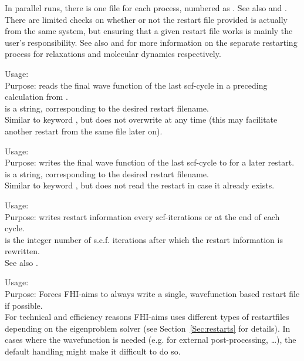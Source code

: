 In parallel runs, there is one file for each process, numbered 
as . See also  
and . There are limited checks on
whether or not the restart file provided is actually from the same
system, but ensuring that a given restart file works is mainly the
user's responsibility. See also 
and  for more information on the separate restarting process for
relaxations and molecular dynamics respectively.

{
  \noindent
  Usage:   \\[1.0ex]
  Purpose: reads the final wave function of the last scf-cycle in a
    preceding calculation from .\\[1.0ex]
   is a string, corresponding to the desired restart
  filename. \\
} 
Similar to keyword , but does not overwrite
 at any time (this may facilitate another restart from 
the same file later on). 

{
  \noindent
  Usage:   \\[1.0ex]
  Purpose: writes the final wave function of the last scf-cycle to
   for a later restart. \\[1.0ex] 
   is a string, corresponding to the desired restart
  filename. \\
}
Similar to keyword , but does not read the restart
   in case it already exists. 

{
  \noindent
  Usage:   \\[1.0ex]
  Purpose: writes restart information every 
    scf-iterations or at the end of each cycle. \\[1.0ex]
   is the integer number of s.c.f. iterations after
  which the restart information is rewritten. \\
} 
See also .

{
  \noindent
  Usage:   \\[1.0ex]
  Purpose: Forces FHI-aims to always write a single, wavefunction based restart
  file if possible.\\[1.0ex]
}
For technical and efficiency reasons FHI-aims uses different types of
restartfiles depending on the eigenproblem solver (see
Section~\ref{Sec:restarts} for details). In cases where the wavefunction is
needed (e.g. for external post-processing, \ldots), the default 
handling might make it difficult to do so.

